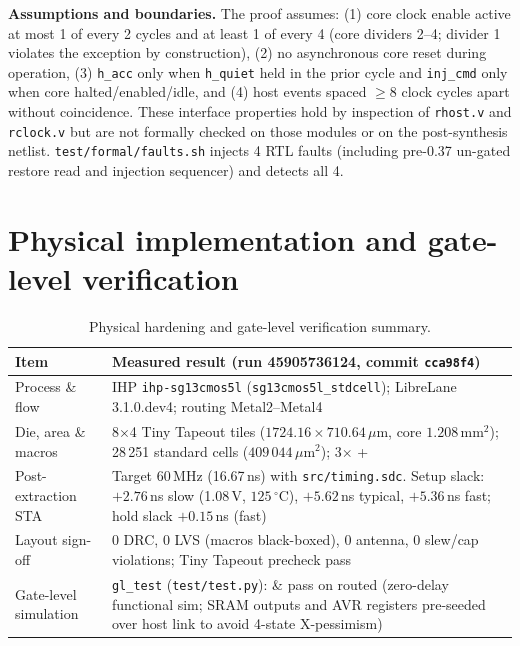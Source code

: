 \documentclass[10pt,a4paper]{article}
\begin{document}
\textbf{Assumptions and boundaries.} The proof assumes: (1) core clock enable active at most 1 of every 2 cycles and at
least 1 of every 4 (core dividers 2--4; divider 1 violates the exception by construction), (2) no asynchronous core
reset during operation, (3) \texttt{h\_acc} only when \texttt{h\_quiet} held in the prior cycle and \texttt{inj\_cmd}
only when core halted/enabled/idle, and (4) host events spaced $\ge 8$ clock cycles apart without coincidence.
These interface properties hold by inspection of \texttt{rhost.v} and \texttt{rclock.v} but are not formally
checked on those modules or on the post-synthesis netlist. \texttt{test/formal/faults.sh} injects 4 RTL faults
(including pre-0.37 un-gated restore read and injection sequencer) and detects all 4.

\section{Physical implementation and gate-level verification}\label{sec:phys}

\begin{table}[H]
\centering\small
\begin{tabularx}{\linewidth}{@{}lL@{}}
\toprule
Item & Measured result (run 45905736124, commit \texttt{cca98f4}) \\
\midrule
Process \& flow & IHP \texttt{ihp-sg13cmos5l} (\texttt{sg13cmos5l\_stdcell}); LibreLane 3.1.0.dev4; routing Metal2--Metal4 \\
Die, area \& macros & 8$\times$4 Tiny Tapeout tiles ($1724.16 \times 710.64\,\mu$m, core $1.208\,\mathrm{mm}^2$); 28\,251 standard cells ($409\,044\,\mu\mathrm{m}^2$); 3$\times$  +  \\
Post-extraction STA & Target 60\,MHz (16.67\,ns) with \texttt{src/timing.sdc}. Setup slack: $+2.76$\,ns slow (1.08\,V, $125\,^\circ$C), $+5.62$\,ns typical, $+5.36$\,ns fast; hold slack $+0.15$\,ns (fast) \\
Layout sign-off & 0 DRC, 0 LVS (macros black-boxed), 0 antenna, 0 slew/cap violations; Tiny Tapeout precheck pass \\
Gate-level simulation & \texttt{gl\_test} (\texttt{test/test.py}):  \&  pass on routed  (zero-delay functional sim; SRAM outputs and AVR registers pre-seeded over host link to avoid 4-state X-pessimism) \\
\bottomrule
\end{tabularx}
\caption{Physical hardening and gate-level verification summary.}
\end{table}
\end{document}
